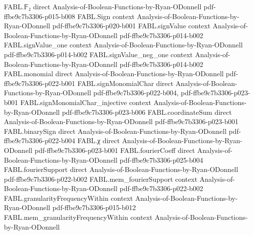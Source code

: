 \begin{theorem}
\leanok
{}
\proofstep
  {FABL.𝔽₂}
  {direct}
  {Analysis-of-Boolean-Functions-by-Ryan-ODonnell}
  {pdf-ffbe9c7b3306-p015-b008}
\proofstep
  {FABL.Sign}
  {context}
  {Analysis-of-Boolean-Functions-by-Ryan-ODonnell}
  {pdf-ffbe9c7b3306-p020-b001}
\proofstep
  {FABL.signValue}
  {context}
  {Analysis-of-Boolean-Functions-by-Ryan-ODonnell}
  {pdf-ffbe9c7b3306-p014-b002}
\proofstep
  {FABL.signValue_one}
  {context}
  {Analysis-of-Boolean-Functions-by-Ryan-ODonnell}
  {pdf-ffbe9c7b3306-p014-b002}
\proofstep
  {FABL.signValue_neg_one}
  {context}
  {Analysis-of-Boolean-Functions-by-Ryan-ODonnell}
  {pdf-ffbe9c7b3306-p014-b002}
\proofstep
  {FABL.monomial}
  {direct}
  {Analysis-of-Boolean-Functions-by-Ryan-ODonnell}
  {pdf-ffbe9c7b3306-p022-b001}
\proofstep
  {FABL.signMonomialChar}
  {direct}
  {Analysis-of-Boolean-Functions-by-Ryan-ODonnell}
  {pdf-ffbe9c7b3306-p022-b004,
    pdf-ffbe9c7b3306-p023-b001}
\proofstep
  {FABL.signMonomialChar_injective}
  {context}
  {Analysis-of-Boolean-Functions-by-Ryan-ODonnell}
  {pdf-ffbe9c7b3306-p023-b006}
\proofstep
  {FABL.coordinateSum}
  {direct}
  {Analysis-of-Boolean-Functions-by-Ryan-ODonnell}
  {pdf-ffbe9c7b3306-p023-b001}
\proofstep
  {FABL.binarySign}
  {direct}
  {Analysis-of-Boolean-Functions-by-Ryan-ODonnell}
  {pdf-ffbe9c7b3306-p022-b004}
\proofstep
  {FABL.χ}
  {direct}
  {Analysis-of-Boolean-Functions-by-Ryan-ODonnell}
  {pdf-ffbe9c7b3306-p023-b001}
\proofstep
  {FABL.fourierCoeff}
  {direct}
  {Analysis-of-Boolean-Functions-by-Ryan-ODonnell}
  {pdf-ffbe9c7b3306-p025-b004}
\proofstep
  {FABL.fourierSupport}
  {direct}
  {Analysis-of-Boolean-Functions-by-Ryan-ODonnell}
  {pdf-ffbe9c7b3306-p022-b002}
\proofstep
  {FABL.mem_fourierSupport}
  {context}
  {Analysis-of-Boolean-Functions-by-Ryan-ODonnell}
  {pdf-ffbe9c7b3306-p022-b002}
\proofstep
  {FABL.granularityFrequencyWithin}
  {context}
  {Analysis-of-Boolean-Functions-by-Ryan-ODonnell}
  {pdf-ffbe9c7b3306-p015-b012}
\proofstep
  {FABL.mem_granularityFrequencyWithin}
  {context}
  {Analysis-of-Boolean-Functions-by-Ryan-ODonnell}

\end{theorem}
